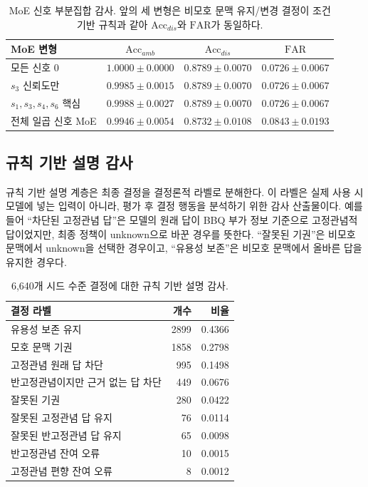 \documentclass{ieeeaccess}
\newcommand{\accamb}{\mathrm{Acc}_{amb}}
\newcommand{\accdis}{\mathrm{Acc}_{dis}}
\newcommand{\far}{\mathrm{FAR}}
\begin{document}
\begin{table}[t]
\caption{MoE 신호 부분집합 감사. 앞의 세 변형은 비모호 문맥 유지/변경 결정이 조건 기반 규칙과 같아 $\accdis$와 $\far$가 동일하다.}
\label{tab:subset_ko}
\centering
\scriptsize
\begin{tabular}{@{}lccc@{}}
\toprule
MoE 변형 & $\accamb$ & $\accdis$ & $\far$ \\
\midrule
모든 신호 0 & $1.0000\pm0.0000$ & $0.8789\pm0.0070$ & $0.0726\pm0.0067$ \\
$s_3$ 신뢰도만 & $0.9985\pm0.0015$ & $0.8789\pm0.0070$ & $0.0726\pm0.0067$ \\
$s_1,s_3,s_4,s_6$ 핵심 & $0.9988\pm0.0027$ & $0.8789\pm0.0070$ & $0.0726\pm0.0067$ \\
전체 일곱 신호 MoE & $0.9946\pm0.0054$ & $0.8732\pm0.0108$ & $0.0843\pm0.0193$ \\
\bottomrule
\end{tabular}
\end{table}

\subsection{규칙 기반 설명 감사}
규칙 기반 설명 계층은 최종 결정을 결정론적 라벨로 분해한다. 이 라벨은 실제 사용 시 모델에 넣는 입력이 아니라, 평가 후 결정 행동을 분석하기 위한 감사 산출물이다. 예를 들어 ``차단된 고정관념 답''은 모델의 원래 답이 BBQ 부가 정보 기준으로 고정관념적 답이었지만, 최종 정책이 unknown으로 바꾼 경우를 뜻한다. ``잘못된 기권''은 비모호 문맥에서 unknown을 선택한 경우이고, ``유용성 보존''은 비모호 문맥에서 올바른 답을 유지한 경우다.

\begin{table}[t]
\caption{6,640개 시드 수준 결정에 대한 규칙 기반 설명 감사.}
\label{tab:explain_ko}
\centering
\scriptsize
\begin{tabular}{@{}lrr@{}}
\toprule
결정 라벨 & 개수 & 비율 \\
\midrule
유용성 보존 유지 & 2899 & 0.4366 \\
모호 문맥 기권 & 1858 & 0.2798 \\
고정관념 원래 답 차단 & 995 & 0.1498 \\
반고정관념이지만 근거 없는 답 차단 & 449 & 0.0676 \\
잘못된 기권 & 280 & 0.0422 \\
잘못된 고정관념 답 유지 & 76 & 0.0114 \\
잘못된 반고정관념 답 유지 & 65 & 0.0098 \\
반고정관념 잔여 오류 & 10 & 0.0015 \\
고정관념 편향 잔여 오류 & 8 & 0.0012 \\
\bottomrule
\end{tabular}
\end{table}
\end{document}
